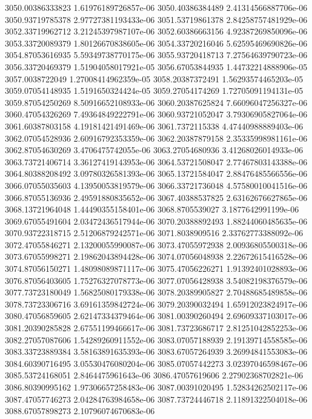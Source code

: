 {3050.00386333823 1.61976189726857e-06
3050.40386384489 2.41314566887706e-06
3050.93719785378 2.97727381193433e-06
3051.53719861378 2.84258757481929e-06
3052.33719962712 3.21245397987107e-06
3052.60386663156 4.92387269850096e-06
3053.33720089379 1.80126670838605e-06
3054.33720216046 5.62595469690826e-06
3054.87053616935 5.59349738770175e-06
3055.93720418713 7.27564639790723e-06
3056.33720469379 1.51904058017921e-05
3056.67053844935 1.44732214888906e-05
3057.0038722049 1.27008414962359e-05
3058.20387372491 1.56293574465203e-05
3059.07054148935 1.5191650324424e-05
3059.27054174269 1.72705091194131e-05
3059.87054250269 8.50916652108933e-06
3060.20387625824 7.66096047256327e-06
3060.47054326269 7.49364849222791e-06
3060.93721052047 3.79306905827064e-06
3061.60387803158 4.19181421491469e-06
3061.7372115338 4.47440988889403e-06
3062.07054528936 2.60916792353359e-06
3062.20387879158 2.35335998981161e-06
3062.87054630269 3.4706475742055e-06
3063.27054680936 3.41268026014933e-06
3063.73721406714 3.36127419143953e-06
3064.53721508047 2.77467803143388e-06
3064.80388208492 3.09780326581393e-06
3065.13721584047 2.88476485566556e-06
3066.07055035603 4.13950053819579e-06
3066.33721736048 4.57580010041516e-06
3066.87055136936 2.49591880835652e-06
3067.40388537825 2.63162676627865e-06
3068.13721964048 1.44490355158401e-06
3068.8705539027 3.1877642991199e-06
3069.67055491604 2.03472436517944e-06
3070.20388892493 1.88244060485635e-06
3070.93722318715 2.51206879242571e-06
3071.8038909516 2.33762773388092e-06
3072.47055846271 2.13200055990087e-06
3073.47055972938 2.00936805500318e-06
3073.67055998271 2.19862043894428e-06
3074.07056048938 2.22672615416528e-06
3074.87056150271 1.48098089871117e-06
3075.47056226271 1.91392401028893e-06
3076.87056403605 1.75276327078773e-06
3077.07056428938 3.54082198376579e-06
3077.73723180049 1.56825080179338e-06
3078.20389905827 2.70488685489858e-06
3078.73723306716 3.69161359842724e-06
3079.20390032494 1.65912023824917e-06
3080.47056859605 2.62147334379464e-06
3081.00390260494 2.69609337103017e-06
3081.20390285828 2.67551199466617e-06
3081.73723686717 2.81251042852253e-06
3082.27057087606 1.54289260911552e-06
3083.07057188939 2.19139714558585e-06
3083.33723889384 3.58163891635393e-06
3083.67057264939 3.26994841553083e-06
3084.60390716495 3.05530476080204e-06
3085.07057442273 3.02397046598467e-06
3085.53724168051 2.8464475961643e-06
3086.47057619606 2.27902368702821e-06
3086.80390995162 1.97306657258483e-06
3087.00391020495 1.52834262502117e-06
3087.47057746273 2.04284763984658e-06
3087.73724446718 2.11891322504018e-06
3088.67057898273 2.10796074670683e-06
}
